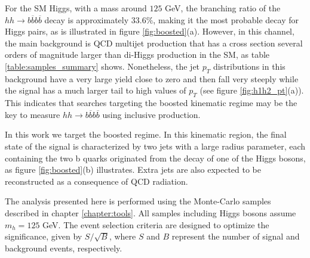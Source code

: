 %


For the SM Higgs, with a mass around $125$ GeV, the branching ratio of the $hh\rightarrow b\overline{b}b\overline{b}$ decay is approximately $33.6\%$, making it the most probable decay for Higgs pairs, as is illustrated in figure \ref{fig:boosted}(a).
However, in this channel, the main background is QCD multijet production that has a cross section several orders of magnitude larger than di-Higgs production in the SM, as table \ref{table:samples_summary} shows. Nonetheless, the jet $p_T$ distributions in this background have a very large yield close to zero and then fall very steeply while the signal has a much larger tail to high values of $p_T$ (see figure \ref{fig:h1h2_pt}(a)). This indicates that searches targeting the boosted kinematic regime may be the key to measure $hh\rightarrow b\overline{b}b\overline{b}$ using inclusive production.

In this work we target the boosted regime. In this kinematic region, the final state of the signal is characterized by two jets with a large radius parameter, each containing the two b quarks originated from the decay of one of the Higgs bosons, as figure \ref{fig:boosted}(b) illustrates. Extra jets are also expected to be reconstructed as a consequence of QCD radiation. 

The analysis presented here is performed using the Monte-Carlo samples described in chapter \ref{chapter:tools}. All samples including Higgs bosons assume $m_h=125$ GeV. The event selection criteria are designed to optimize the significance, given by $S/\sqrt{B}$, where $S$ and $B$ represent the number of signal and background events, respectively. 

